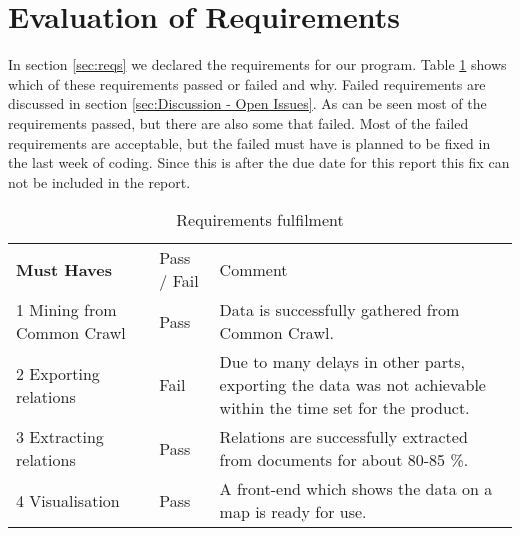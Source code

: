 \section{Evaluation of Requirements}
In section \ref{sec:reqs} we declared the requirements for our program. Table \ref{requirements_pass/fail} shows which of these requirements passed or failed and why. Failed requirements are discussed in section \ref{sec:Discussion - Open Issues}. As can be seen most of the requirements passed, but there are also some that failed. Most of the failed requirements are acceptable, but the failed must have is planned to be fixed in the last week of coding. Since this is after the due date for this report this fix can not be included in the report.\\

\begin{table}[H]
\centering
\caption{Requirements fulfilment}
\label{requirements_pass/fail}
\begin{tabular}{ll m{8cm}}
\textbf{Must Haves}                     & Pass / Fail & Comment                                                                                                                                                                                                                           \\
1 Mining from Common Crawl     & Pass        & Data is successfully gathered from Common Crawl.                                                                                                                                                                                       \\ \hline
2 Exporting relations          & Fail        & Due to many delays in other parts, exporting the data was not achievable within the time set for the product.                                                                                                                         \\ \hline
3 Extracting relations         & Pass        & Relations are successfully extracted from documents for about 80-85 \%.                                                                                                                                                            \\ \hline
4 Visualisation                & Pass        & A front-end which shows the data on a map is ready for use.                                                                                                                                                                           \\ \hline

\end{tabular}
\end{table}
